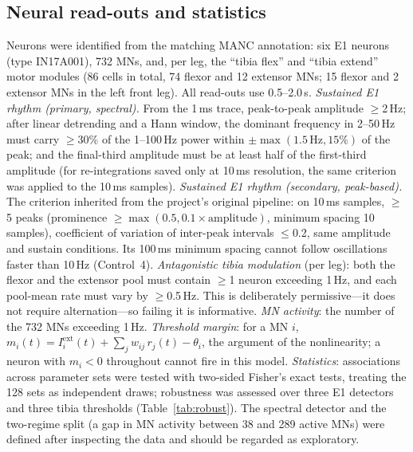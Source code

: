 \documentclass[11pt]{article}
\begin{document}
\subsection{Neural read-outs and statistics}
Neurons were identified from the matching MANC annotation: six E1 neurons (type IN17A001), 732 MNs, and, per leg, the ``tibia flex'' and ``tibia extend'' motor modules (86 cells in total, 74 flexor and 12 extensor MNs; 15 flexor and 2 extensor MNs in the left front leg). All read-outs use 0.5--2.0\,s.
\emph{Sustained E1 rhythm (primary, spectral).} From the 1\,ms trace, peak-to-peak amplitude $\geq$2\,Hz; after linear detrending and a Hann window, the dominant frequency in 2--50\,Hz must carry $\geq$30\% of the 1--100\,Hz power within $\pm\max(1.5\,\mathrm{Hz}, 15\%)$ of the peak; and the final-third amplitude must be at least half of the first-third amplitude (for re-integrations saved only at 10\,ms resolution, the same criterion was applied to the 10\,ms samples).
\emph{Sustained E1 rhythm (secondary, peak-based).} The criterion inherited from the project's original pipeline: on 10\,ms samples, $\geq$5 peaks (prominence $\geq\max(0.5, 0.1\times\text{amplitude})$, minimum spacing 10 samples), coefficient of variation of inter-peak intervals $\leq$0.2, same amplitude and sustain conditions. Its 100\,ms minimum spacing cannot follow oscillations faster than 10\,Hz (Control~4).
\emph{Antagonistic tibia modulation} (per leg): both the flexor and the extensor pool must contain $\geq$1 neuron exceeding 1\,Hz, and each pool-mean rate must vary by $\geq$0.5\,Hz. This is deliberately permissive---it does not require alternation---so failing it is informative.
\emph{MN activity}: the number of the 732 MNs exceeding 1\,Hz.
\emph{Threshold margin}: for a MN $i$, $m_i(t)=I_i^{\text{ext}}(t)+\sum_j w_{ij}\,r_j(t)-\theta_i$, the argument of the nonlinearity; a neuron with $m_i<0$ throughout cannot fire in this model.
\emph{Statistics}: associations across parameter sets were tested with two-sided Fisher's exact tests, treating the 128 sets as independent draws; robustness was assessed over three E1 detectors and three tibia thresholds (Table~\ref{tab:robust}). The spectral detector and the two-regime split (a gap in MN activity between 38 and 289 active MNs) were defined after inspecting the data and should be regarded as exploratory.
\end{document}
